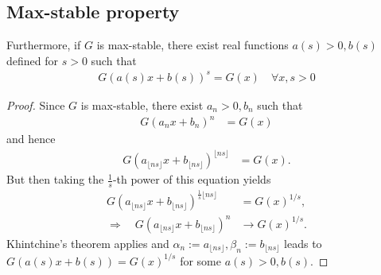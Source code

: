 \documentclass[english, parskip=full]{scrartcl}
\newcommand{\kla}{}
\begin{document}
\subsection{Max-stable property}
Furthermore, if $G$ is max-stable, there exist real functions $a(s)>0,b(s)$ defined for $s>0$ such that
\begin{align}
G(a(s)x + b(s))^s = G(x)\quad \forall x,s>0 \label{eqn:khintchine theorem corollary}
\end{align}
\begin{proof}
Since $G$ is max-stable, there exist $a_n>0, b_n$ such that 
\begin{align}
G(a_nx + b_n)^n &= G(x)
\end{align}
and hence
\begin{align}
G(a_{\lfloor ns \rfloor} x + b_{\lfloor ns \rfloor})^{\lfloor ns \rfloor} &= G(x).
\end{align}
But then taking the $\frac{1}{s}$-th power of this equation yields
\begin{align}
G(a_{\lfloor ns \rfloor}x + b_{\lfloor ns \rfloor})^{\frac{1}{s} \lfloor ns \rfloor} &= G(x)^{1/s},\\
\Rightarrow\quad G(a_{\lfloor ns \rfloor}x + b_{\lfloor ns \rfloor})^n &\rightarrow G(x)^{1/s}.
\end{align}
Khintchine's theorem applies and $\alpha_n := a_{\lfloor ns \rfloor}, \beta_n := b_{\lfloor ns \rfloor}$ leads to $G(a(s)x + b(s)) = G(x)^{1/s}$ for some $a(s) > 0, b(s)$.
\end{proof}
\end{document}
